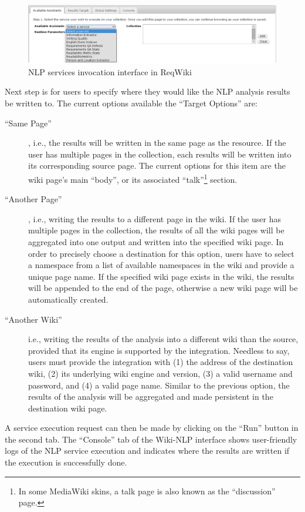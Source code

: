 \documentclass[10pt,twoside,openany,bibtotoc,liststotoc]{scrbook}
\newcommand{\blankline}{\vspace{5mm}}
\begin{document}
\begin{figure}[h!]
\centering
\includegraphics[width=\textwidth]{reqwiki-sa}
\caption{NLP services invocation interface in ReqWiki}
\label{fig:reqwiki_sa}
\end{figure}

\blankline
Next step is for users to specify where they would like the NLP analysis results be written to. The current options available the ``Target Options'' are:

\begin{description}
\item [``Same Page''], i.e., the results will be written in the same page as the resource. If the user has multiple pages in the collection, each results will be written into its corresponding source page. The current options for this item are the wiki page's main ``body'', or its associated ``talk''\footnote{In some MediaWiki skins, a talk page is also known as the ``discussion'' page.} section.
\item[``Another Page''], i.e., writing the results to a different page in the wiki. If the user has multiple pages in the collection, the results of all the wiki pages will be aggregated into one output and written into the specified wiki page. In order to precisely choose a destination for this option, users have to select a namespace from a list of available namespaces in the wiki and provide a unique page name. If the specified wiki page exists in the wiki, the results will be appended to the end of the page, otherwise a new wiki page will be automatically created.
\item[``Another Wiki''] i.e., writing the results of the analysis into a different wiki than the source, provided that its engine is supported by the integration. Needless to say, users must provide the integration with (1) the address of the destination wiki, (2) its underlying wiki engine and version, (3) a valid username and password, and (4) a valid page name. Similar to the previous option, the results of the analysis will be aggregated and made persistent in the destination wiki page.
\end{description}

A service execution request can then be made by clicking on the ``Run'' button in the second tab. The ``Console'' tab of the Wiki-NLP interface shows user-friendly logs of the NLP service execution and indicates where the results are written if the execution is successfully done.
\end{document}
